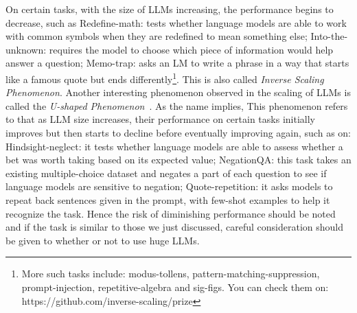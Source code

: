 \documentclass[manuscript,screen, nonacm]{acmart}
\begin{document}
On certain tasks, with the size of LLMs increasing, the performance begins to decrease, such as Redefine-math: tests whether language models are able to work with common symbols when they are redefined to mean something else; Into-the-unknown: requires the model to choose which piece of information would help answer a question; Memo-trap: asks an LM to write a phrase in a way that starts like a famous quote but ends differently\footnote{More such tasks include: modus-tollens, pattern-matching-suppression, prompt-injection, repetitive-algebra and sig-figs. You can check them on: https://github.com/inverse-scaling/prize}. This is also called \textit{Inverse Scaling Phenomenon}.
Another interesting phenomenon observed in the scaling of LLMs is called the \textit{U-shaped Phenomenon}~\cite{wei2022inverse}. As the name implies, This phenomenon refers to that as LLM size increases, their performance on certain tasks initially improves but then starts to decline before eventually improving again, such as on: Hindsight-neglect: it tests whether language models are able to assess whether a bet was worth taking based on its expected value; NegationQA: this task takes an existing multiple-choice dataset and negates a part of each question to see if language models are sensitive to negation; Quote-repetition: it asks models to repeat back sentences given in the prompt, with few-shot examples to help it recognize the task. 
Hence the risk of diminishing performance should be noted and if the task is similar to those we just discussed, careful consideration should be given to whether or not to use huge LLMs. 
\end{document}
